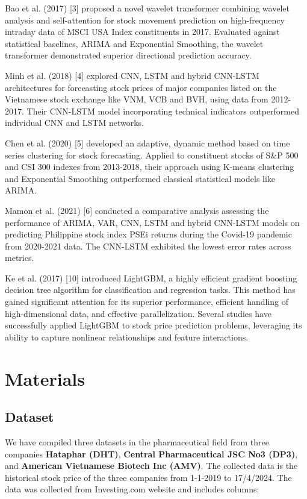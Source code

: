 \documentclass{ieeeojies}
\begin{document}
Bao et al. (2017) [3] proposed a novel wavelet transformer combining wavelet analysis and self-attention for stock movement prediction on high-frequency intraday data of MSCI USA Index constituents in 2017. Evaluated against statistical baselines, ARIMA and Exponential Smoothing, the wavelet transformer demonstrated superior directional prediction accuracy.

Minh et al. (2018) [4] explored CNN, LSTM and hybrid CNN-LSTM architectures for forecasting stock prices of major companies listed on the Vietnamese stock exchange like VNM, VCB and BVH, using data from 2012-2017. Their CNN-LSTM model incorporating technical indicators outperformed individual CNN and LSTM networks.

Chen et al. (2020) [5] developed an adaptive, dynamic method based on time series clustering for stock forecasting. Applied to constituent stocks of S\&P 500 and CSI 300 indexes from 2013-2018, their approach using K-means clustering and Exponential Smoothing outperformed classical statistical models like ARIMA.

Mamon et al. (2021) [6] conducted a comparative analysis assessing the performance of ARIMA, VAR, CNN, LSTM and hybrid CNN-LSTM models on predicting Philippine stock index PSEi returns during the Covid-19 pandemic from 2020-2021 data. The CNN-LSTM exhibited the lowest error rates across metrics.

Ke et al. (2017) [10] introduced LightGBM, a highly efficient gradient boosting decision tree algorithm for classification and regression tasks. This method has gained significant attention for its superior performance, efficient handling of high-dimensional data, and effective parallelization. Several studies have successfully applied LightGBM to stock price prediction problems, leveraging its ability to capture nonlinear relationships and feature interactions. 
 \\
\section{Materials}
\subsection{Dataset}
We have compiled three datasets in the pharmaceutical field from three companies  \textbf{Hataphar (DHT)}, \textbf{Central Pharmaceutical JSC No3 (DP3)}, and \textbf{American
Vietnamese Biotech Inc (AMV)}. The collected data is the historical stock price of the three companies from 1-1-2019 to 17/4/2024. The data was collected from Investing.com website and includes columns:
\end{document}
